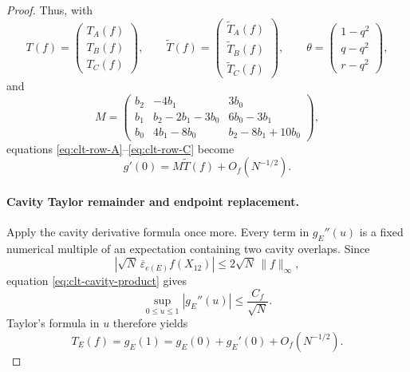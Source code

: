 \begin{proof}
Thus, with
\[
 T(f)=
 \begin{pmatrix}
 T_A(f)\\ T_B(f)\\ T_C(f)
 \end{pmatrix},
 \qquad
 \widetilde T(f)=
 \begin{pmatrix}
 \widetilde T_A(f)\\
 \widetilde T_B(f)\\
 \widetilde T_C(f)
 \end{pmatrix},
 \qquad
 \theta=
 \begin{pmatrix}
 1-q^2\\ q-q^2\\ r-q^2
 \end{pmatrix},
\]
and
\begin{equation}
 M=
 \begin{pmatrix}
 b_2 & -4b_1 & 3b_0\\
 b_1 & b_2-2b_1-3b_0 & 6b_0-3b_1\\
 b_0 & 4b_1-8b_0 & b_2-8b_1+10b_0
 \end{pmatrix},
 \label{eq:clt-cavity-matrix}
\end{equation}
equations \eqref{eq:clt-row-A}--\eqref{eq:clt-row-C} become
\begin{equation}
 g'(0)
 =
 M\widetilde T(f)+O_f(N^{-1/2}).
 \label{eq:clt-g-prime-zero}
\end{equation}

\paragraph{Cavity Taylor remainder and endpoint replacement.}
Apply the cavity derivative formula once more.  Every term in $g_E''(u)$ is
a fixed numerical multiple of an expectation containing two cavity overlaps.
Since
\[
 \left|
 \sqrt N\,
 \overline\varepsilon_{e(E)}f(X_{12})
 \right|
 \le
 2\sqrt N\,\|f\|_\infty,
\]
equation \eqref{eq:clt-cavity-product} gives
\begin{equation}
 \sup_{0\le u\le1}|g_E''(u)|
 \le
 \frac{C_f}{\sqrt N}.
 \label{eq:clt-second-cavity-derivative}
\end{equation}
Taylor's formula in $u$ therefore yields
\begin{equation}
 T_E(f)=g_E(1)
 =
 g_E(0)+g_E'(0)+O_f(N^{-1/2}).
 \label{eq:clt-cavity-Taylor}
\end{equation}


\end{proof}
